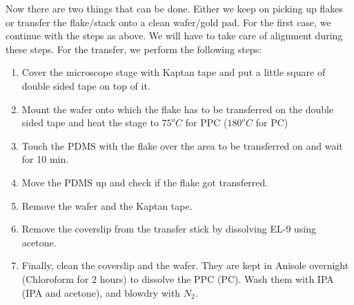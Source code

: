 Now there are two things that can be done. Either we keep on picking up flakes or transfer the flake/stack onto a clean wafer/gold pad. For the first case, we continue with the steps as above. We will have to take care of alignment during these steps. For the transfer, we perform the following steps:
\begin{enumerate}
\item Cover the microscope stage with Kaptan tape and put a little square of double sided tape on top of it.
\item Mount the wafer onto which the flake has to be transferred on the double sided tape and heat the stage to $75 ^o C$ for PPC ($180 ^oC$ for PC)
\item Touch the PDMS with the flake over the area to be transferred on and wait for 10 min.
\item Move the PDMS up and check if the flake got transferred.
\item Remove the wafer and the Kaptan tape.
\item Remove the coverslip from the transfer stick by dissolving EL-9 using acetone.
\item Finally, clean the coverslip and the wafer. They are kept in Anisole overnight (Chloroform for 2 hours) to dissolve the PPC (PC). Wash them with IPA (IPA and acetone), and blowdry with $N_2$.
\end{enumerate}
